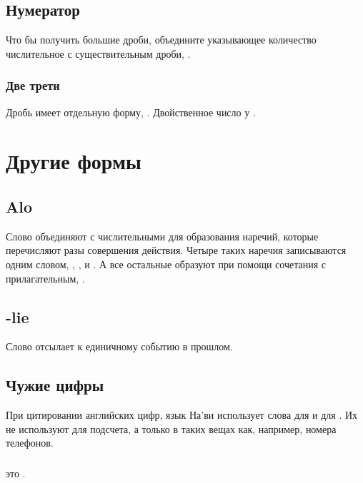 \subsection{Нумератор} Что бы получить большие дроби, объедините указывающее ко\-ли\-че\-ство числительное с существительным дроби,   .

\subsubsection{Две трети} Дробь  имеет отдельную форму, . Двойственное число у . 


\section{Другие формы}

\subsection{Alo} Слово   объединяют с числительными для образования наречий, которые перечисляют разы совершения действия. Четыре таких наречия записываются одним словом,
 ,  , 
 и  .
А все остальные образуют при помощи сочетания с прилагательным,  . 

\subsection{-lie} Слово   отсылает к единичному событию в прошлом. 

\subsection{Чужие цифры} При цитировании английских цифр, язык На'ви использует слова
 для  и  для . Их не используют для подсчета, а только в  таких вещах как, например, номера телефонов.

\subsubsection{}  это .  
